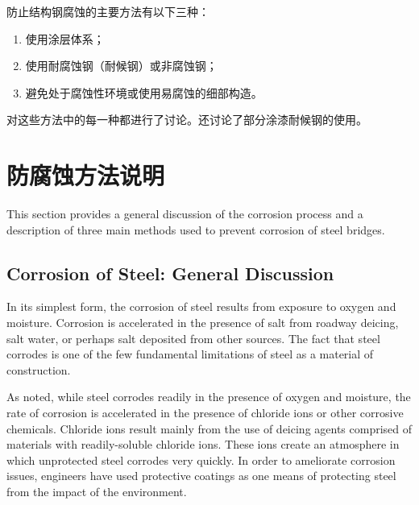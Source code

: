 防止结构钢腐蚀的主要方法有以下三种：
\begin{enumerate}
  \item 使用涂层体系；
  \item 使用耐腐蚀钢（耐候钢）或非腐蚀钢；
  \item 避免处于腐蚀性环境或使用易腐蚀的细部构造。
\end{enumerate}

对这些方法中的每一种都进行了讨论。还讨论了部分涂漆耐候钢的使用。

\section{防腐蚀方法说明}\label{sec:method-corrosion-prevention}
This section provides a general discussion of the corrosion process and a description of three main methods used to prevent corrosion of steel bridges.

\subsection{Corrosion of Steel: General Discussion}
In its simplest form, the corrosion of steel results from exposure to oxygen and moisture. Corrosion is accelerated in the presence of salt from roadway deicing, salt water, or perhaps salt deposited from other sources. The fact that steel corrodes is one of the few fundamental limitations of steel as a material of construction.

As noted, while steel corrodes readily in the presence of oxygen and moisture, the rate of corrosion is accelerated in the presence of chloride ions or other corrosive chemicals. Chloride ions result mainly from the use of deicing agents comprised of materials with readily-soluble chloride ions. These ions create an atmosphere in which unprotected steel corrodes very quickly. In order to ameliorate corrosion issues, engineers have used protective coatings as one means of protecting steel from the impact of the environment.

